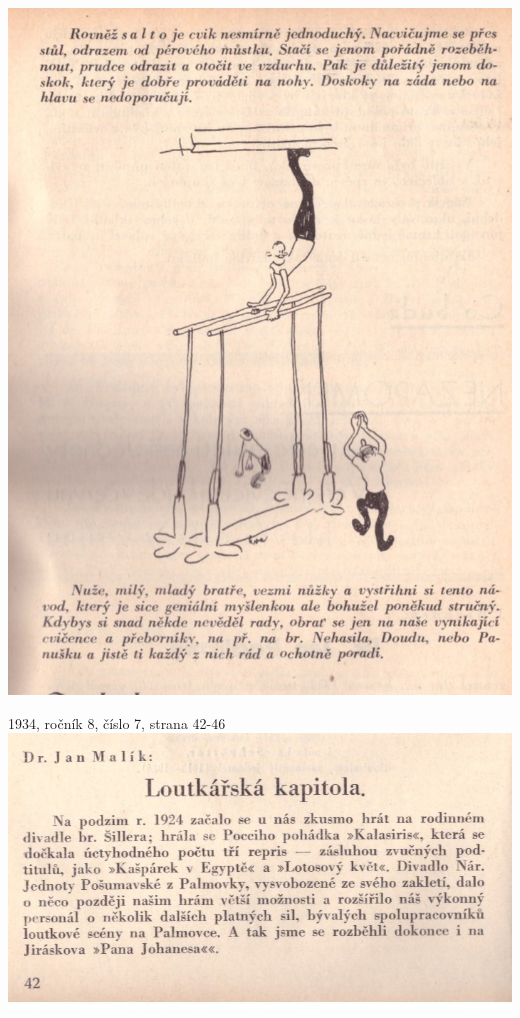 \documentclass[11pt]{article}
\begin{document}
\includegraphics[width=\imagewidth]{original/1934/Skener_20250325 (10).jpg}

1934, ročník 8, číslo 7, strana 42-46 \\
\includegraphics[width=\imagewidth]{original/1934/Skener_20250325 (11).jpg}
\end{document}
